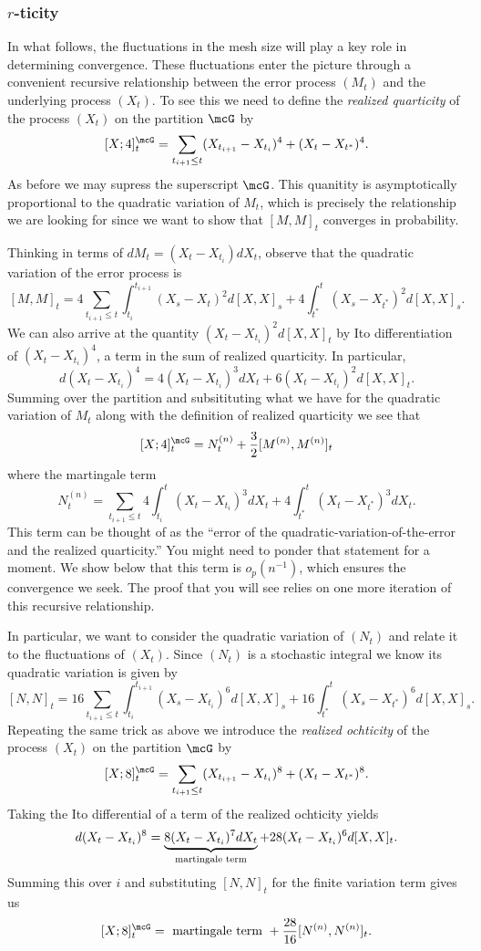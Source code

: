 \documentclass{report}
\begin{document}
\subsubsection{$r$-ticity}

In what follows, the fluctuations in the mesh size will play a key
role in determining convergence.  These fluctuations enter the picture
through a convenient recursive relationship between the error process
$(M_t)$ and the underlying process $(X_t)$.  To see this we need to
define the \emph{realized quarticity} of the process $(X_t)$ on the
partition $\mcG$ by
\[
[X;4]_t^\mcG = \sum_{t_{i+1} \leq t} (X_{t_{i+1}} - X_{t_i})^4 + (X_t
- X_{t^*})^4.
\]
As before we may supress the superscript $\mcG$.  This quanitity is
asymptotically proportional to the quadratic variation of $M_t$, which
is precisely the relationship we are looking for since we want to show
that $[M,M]_t$ converges in probability.

Thinking in terms of $dM_t = (X_t - X_{t_i}) dX_t$, observe that the
quadratic variation of the error process is
\[
[M,M]_t = 4 \sum_{t_{i+1} \leq t} \int_{t_i}^{t_{i+1}} (X_s - X_t)^2
d[X,X]_s + 4 \int_{t^*}^t (X_s - X_{t^*})^2 d[X,X]_s.
\]
We can also arrive at the quantity $(X_t - X_{t_i})^2 d[X,X]_t$ by Ito
differentiation of $(X_t - X_{t_i})^4$, a term in the sum of realized
quarticity.  In particular,
\[
d (X_t - X_{t_i})^4 = 4(X_t - X_{t_i})^3 dX_t + 6 (X_t - X_{t_i})^2
d[X,X]_t.
\]
Summing over the partition and subsitituting what we have for the
quadratic variation of $M_t$ along with the definition of realized
quarticity we see that
\[
[X;4]^\mcG_t = N^{(n)}_t + \frac{3}{2} [M^{(n)},M^{(n)}]_t
\]
where the martingale term
\[
N^{(n)}_t =
\sum_{t_{i+1} \leq t} 4 \int_{t_i}^t (X_t - X_{t_i})^3 dX_t +  4
\int_{t^*}^t (X_t - X_{t^*})^3 dX_t.
\]
This term can be thought of as the ``error of the
quadratic-variation-of-the-error and the realized quarticity.''  You
might need to ponder that statement for a moment.  We show below that
this term is $o_p(n^{-1})$, which ensures the convergence we seek. 
The proof that you will see relies on one more iteration of this
recursive relationship.

In particular, we want to consider the quadratic variation of $(N_t)$
and relate it to the fluctuations of $(X_t)$.  Since $(N_t)$ is a
stochastic integral we know its quadratic variation is given by
\[
[N,N]_t = 16 \sum_{t_{i+1} \leq t} \int_{t_i}^{t_{i+1}} (X_s -
X_{t_i})^6 d[X,X]_s + 16 \int_{t^*}^{t} (X_s - X_{t^*})^6 d[X,X]_s.
\]
Repeating the same trick as above we introduce the \emph{realized
ochticity} of the process $(X_t)$ on the partition $\mcG$ by
\[
[X;8]^\mcG_t = \sum_{t_{i+1} \leq t} (X_{t_{i+1}} - X_{t_i})^8 + (X_t
- X_{t^*})^8.
\]
Taking the Ito differential of a term of the realized ochticity yields
\[
d(X_t - X_{t_i})^8 = \underbrace{8 (X_t - X_{t_i})^7
dX_t}_{\textmd{martingale term}} + 28 (X_t - X_{t_i})^6 d[X,X]_t.
\]
Summing this over $i$ and substituting $[N,N]_t$ for the finite
variation term gives us 
\[
[X;8]^\mcG_t = \textmd{ martingale term } + \frac{28}{16}
[N^{(n)},N^{(n)}]_t.
\]
\end{document}
